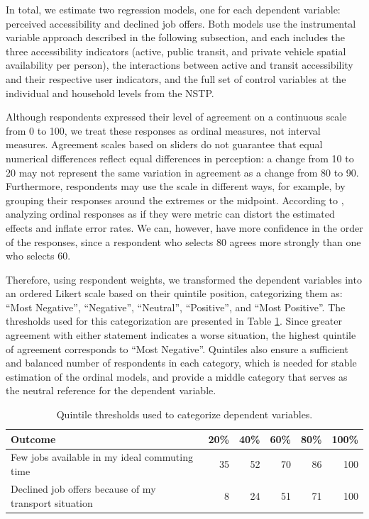 \documentclass[preprint, 3p,
authoryear]{elsarticle} %
\begin{document}
In total, we estimate two regression models, one for each dependent
variable: perceived accessibility and declined job offers. Both models
use the instrumental variable approach described in the following
subsection, and each includes the three accessibility indicators
(active, public transit, and private vehicle spatial availability per
person), the interactions between active and transit accessibility and
their respective user indicators, and the full set of control variables
at the individual and household levels from the NSTP.

Although respondents expressed their level of agreement on a continuous
scale from 0 to 100, we treat these responses as ordinal measures, not
interval measures. Agreement scales based on sliders do not guarantee
that equal numerical differences reflect equal differences in
perception: a change from 10 to 20 may not represent the same variation
in agreement as a change from 80 to 90. Furthermore, respondents may use
the scale in different ways, for example, by grouping their responses
around the extremes or the midpoint. According to \citet{liddell2018},
analyzing ordinal responses as if they were metric can distort the
estimated effects and inflate error rates. We can, however, have more
confidence in the order of the responses, since a respondent who selects
80 agrees more strongly than one who selects 60.

Therefore, using respondent weights, we transformed the dependent
variables into an ordered Likert scale based on their quintile position,
categorizing them as: ``Most Negative'', ``Negative'', ``Neutral'',
``Positive'', and ``Most Positive''. The thresholds used for this
categorization are presented in Table \ref{tab:outcomes_quintiles}.
Since greater agreement with either statement indicates a worse
situation, the highest quintile of agreement corresponds to ``Most
Negative''. Quintiles also ensure a sufficient and balanced number of
respondents in each category, which is needed for stable estimation of
the ordinal models, and provide a middle category that serves as the
neutral reference for the dependent variable.

\begin{table}
\centering
\caption{\label{tab:outcomes-quintiles}\label{tab:outcomes_quintiles}Quintile thresholds used to categorize dependent variables.}
\centering
\fontsize{10}{12}\selectfont
\begin{tabular}[t]{lrrrrr}
\toprule
Outcome & 20\% & 40\% & 60\% & 80\% & 100\%\\
\midrule
Few jobs available in my ideal commuting time & 35 & 52 & 70 & 86 & 100\\
Declined job offers because of my transport situation & 8 & 24 & 51 & 71 & 100\\
\bottomrule
\end{tabular}
\end{table}
\end{document}
